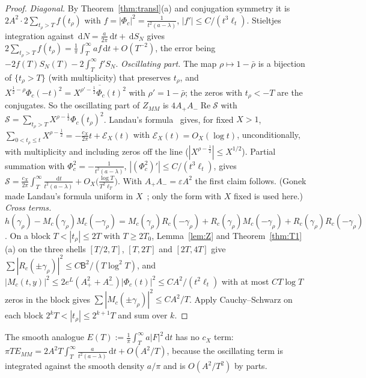 \documentclass[11pt]{amsart}
\newcommand{\dd}{\,\mathrm{d}}
\newcommand{\eps}{\varepsilon}
\DeclareMathOperator{\re}{Re}
\theoremstyle{definition}
\theoremstyle{remark}
\numberwithin{equation}{section}
\begin{document}
\begin{proof}
\emph{Diagonal.} By Theorem~\ref{thm:transl}(a) and conjugation symmetry it is $2A^2\cdot2\sum_{t_\rho>T}f(t_\rho)$ with $f=|\Phi_c|^2=\frac1{t^2(a-\lambda)}$, $|f'|\le C/(t^3\ell_t)$. Stieltjes integration against $\dd N=\frac a{2\pi}\dd t+\dd S_N$ gives $2\sum_{t_\rho>T}f(t_\rho)=\frac1\pi\int_T^\infty af\dd t+O(T^{-2})$, the error being $-2f(T)S_N(T)-2\int_T^\infty f'S_N$.
\emph{Oscillating part.} The map $\rho\mapsto1-\bar\rho$ is a bijection of $\{t_\rho>T\}$ (with multiplicity) that preserves $t_\rho$, and $X^{\frac12-\rho}\Phi_c(-t)^2=\overline{X^{\rho'-\frac12}\Phi_c(t)^2}$ with $\rho'=1-\bar\rho$; the zeros with $t_\rho<-T$ are the conjugates. So the oscillating part of $Z_{MM}$ is $4A_+A_-\re\mathcal S$ with $\mathcal S=\sum_{t_\rho>T}X^{\rho-\frac12}\Phi_c(t_\rho)^2$. Landau's formula~\cite{Lan12} gives, for fixed $X>1$, $\sum_{0<t_\rho\le t}X^{\rho-\frac12}=-\frac{c_X}{2\pi}t+\mathcal E_X(t)$ with $\mathcal E_X(t)=O_X(\log t)$, unconditionally, with multiplicity and including zeros off the line ($|X^{\rho-\frac12}|\le X^{1/2}$). Partial summation with $\Phi_c^2=-\frac1{t^2(a-\lambda)}$, $|(\Phi_c^2)'|\le C/(t^3\ell_t)$, gives $\mathcal S=\frac{c_X}{2\pi}\int_T^\infty\frac{\dd t}{t^2(a-\lambda)}+O_X\bigl(\frac{\log T}{T^2\ell_T}\bigr)$. With $A_+A_-=\eps A^2$ the first claim follows. (Gonek made Landau's formula uniform in $X$~\cite{Gon85,Gon93}; only the form with $X$ fixed is used here.)
\emph{Cross terms.} $h(\gamma_\rho)-M_c(\gamma_\rho)M_c(-\gamma_\rho)=M_c(\gamma_\rho)R_c(-\gamma_\rho)+R_c(\gamma_\rho)M_c(-\gamma_\rho)+R_c(\gamma_\rho)R_c(-\gamma_\rho)$. On a block $T<|t_\rho|\le2T$ with $T\ge2T_0$, Lemma~\ref{lem:Z} and Theorem~\ref{thm:T1}(a) on the three shells $[T/2,T]$, $[T,2T]$ and $[2T,4T]$ give $\sum|R_c(\pm\gamma_\rho)|^2\le C\mathsf B^2/(T\log^2T)$, and $|M_c(t,y)|^2\le2e^L(A_+^2+A_-^2)|\Phi_c(t)|^2\le CA^2/(t^2\ell_t)$ with at most $CT\log T$ zeros in the block gives $\sum|M_c(\pm\gamma_\rho)|^2\le CA^2/T$. Apply Cauchy--Schwarz on each block $2^kT<|t_\rho|\le2^{k+1}T$ and sum over $k$.
\end{proof}

The smooth analogue $E(T):=\frac1\pi\int_T^\infty a|F|^2\dd t$ has no $c_X$ term: $\pi TE_{MM}=2A^2T\int_T^\infty\frac{a}{t^2(a-\lambda)}\dd t+O(A^2/T)$, because the oscillating term is integrated against the smooth density $a/\pi$ and is $O(A^2/T^2)$ by parts.
\end{document}
